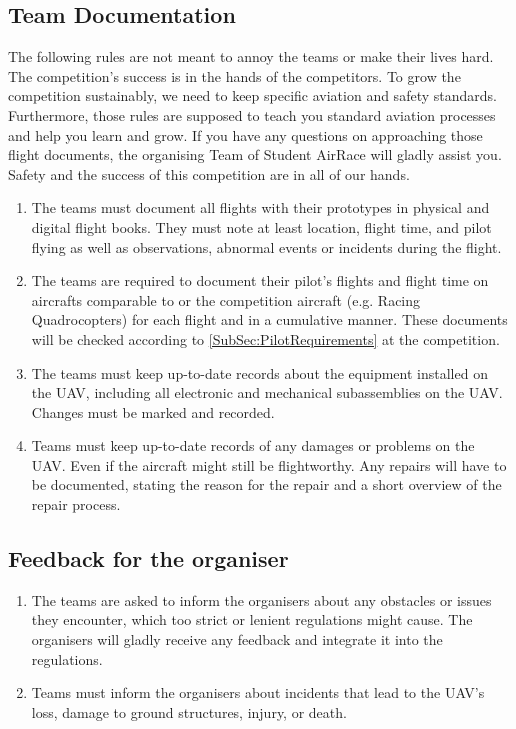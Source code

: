     \subsection{Team Documentation}
    The following rules are not meant to annoy the teams or make their lives hard. The competition's success is in the hands of the competitors. To grow the competition 
    sustainably, we need to keep specific aviation and safety standards. Furthermore, those rules are supposed to teach you standard aviation processes and help you learn and grow. 
    If you have any questions on approaching those flight documents, the organising Team of Student AirRace will gladly assist you. Safety and the success of this competition are in all of our hands.
    \begin{enumerate}
      \item The teams must document all flights with their prototypes in physical and digital flight books. They must note at least location, flight time, and pilot flying as well as observations, abnormal events or incidents during the flight.
      \item The teams are required to document their pilot's flights and flight time on aircrafts comparable to or the competition aircraft (e.g. Racing Quadrocopters)
      for each flight and in a cumulative manner. These documents will be checked according to \ref{SubSec:PilotRequirements} at the competition. 
      \item The teams must keep up-to-date records about the equipment installed on the UAV, including all electronic and mechanical subassemblies on the UAV. 
      Changes must be marked and recorded. 
      \item Teams must keep up-to-date records of any damages or problems on the UAV. Even if the aircraft might still be flightworthy. 
      Any repairs will have to be documented, stating the reason for the repair and a short overview of the repair process. 
    \end{enumerate}

    \subsection{Feedback for the organiser}
    \begin{enumerate}
      \item The teams are asked to inform the organisers about any obstacles or issues they encounter, which too strict or lenient regulations might cause. The organisers will gladly receive any feedback and integrate it into the regulations. 
      \item Teams must inform the organisers about incidents that lead to the UAV's loss, damage to ground structures, injury, or death. 
    \end{enumerate}




